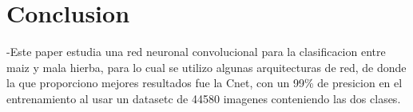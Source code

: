 \documentclass[conference]{IEEEtran}
\begin{document}
	
	
	




\section{Conclusion}

-Este paper estudia una red neuronal convolucional para la clasificacion entre maiz y mala hierba, para lo cual se utilizo algunas arquitecturas de red, de donde la que proporciono mejores resultados fue la Cnet, con un 99\% de presicion en el entrenamiento al usar un datasetc de 44580 imagenes conteniendo las dos clases.  \\
\end{document}
